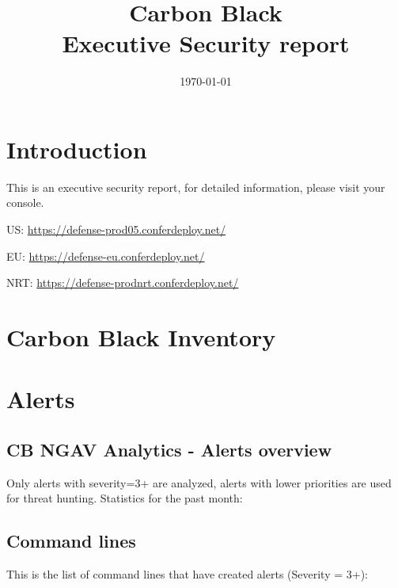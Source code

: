 \documentclass[12pt,letterpaper]{report}
\begin{document}

\thispagestyle{empty}
\bannercbcontainer
\title{Carbon Black\\Executive Security report}

\date{\today}
\logocbcontainer

\newpage

\tableofcontents
\listoftables
\listoffigures

\chapter{Introduction}

This is an executive security report, for detailed information, please visit your console.
\vspace{1cm}

US: \href{https://defense-prod05.conferdeploy.net/}{https://defense-prod05.conferdeploy.net/}

EU: \href{https://defense-eu.conferdeploy.net/}{https://defense-eu.conferdeploy.net/}

NRT: \href{https://defense-prodnrt.conferdeploy.net/}{https://defense-prodnrt.conferdeploy.net/}


\chapter{Carbon Black Inventory}


\chapter{Alerts}
\section{CB NGAV Analytics - Alerts overview}
Only alerts with severity=3+ are analyzed, alerts with lower priorities are used for threat hunting.
\vskip10pt
Statistics for the past month:\\



\section{Command lines}
This is the list of command lines that have created alerts (Severity = 3+):\\
\\
\end{document}
